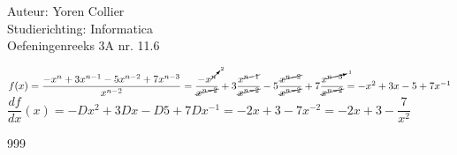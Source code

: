 \documentclass[a4paper]{article}
\newcommand{\schrap}{\cancel}
\newcommand{\vervang}{\cancelto}
\begin{document}
\noindent \large Auteur: Yoren Collier \\
\noindent \large Studierichting: Informatica\\
\noindent \large Oefeningenreeks 3A nr. 11.6\\

\medskip

\normalsize

$f(x) = \dfrac{-x^n+3x^{n-1}-5x^{n-2} +7x^{n-3}}{x^{n-2}} = \dfrac{-x^{\vervang{2}{n}}}{\schrap{x^{n-2}}} +3 \dfrac{x^{\schrap{n-1}}}{\schrap{x^{n-2}}} -5 \dfrac{\schrap{x^{n-2}}}{\schrap{x^{n-2}}} +7 \dfrac{x^{\vervang{1}{n-3}}}{\schrap{x^{n-2}}} = -x^2 +3x -5 +7x^{-1}$\\

$\dfrac{df}{dx}(x) = -Dx^2 +3Dx -D5 +7Dx^{-1} = -2x +3 -7x^{-2} = -2x +3- \dfrac{7}{x^2}$\\

\begin{thebibliography}{999}
\end{thebibliography}
\end{document}
